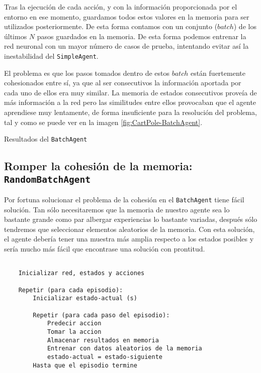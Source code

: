 Tras la ejecución de cada acción, y con la información proporcionada por el entorno en ese momento, guardamos todos estos valores en la memoria para ser utilizados posteriormente. De esta forma contamos con un conjunto ($batch$) de los últimos $N$ pasos guardados en la memoria. De esta forma podemos entrenar la red neuronal con un mayor número de casos de prueba, intentando evitar así la inestabilidad del \texttt{SimpleAgent}.

El problema es que los pasos tomados dentro de estos $batch$ están fuertemente cohesionados entre sí, ya que al ser consecutivos la información aportada por cada uno de ellos era muy similar. La memoria de estados consecutivos proveía de más información a la red pero las similitudes entre ellos provocaban que el agente aprendiese muy lentamente, de forma insuficiente para la resolución del problema, tal y como se puede ver en la imagen \ref{fig:CartPole-BatchAgent}.

%
       {Resultados del \texttt{BatchAgent}}


\subsection{Romper la cohesión de la memoria: \texttt{RandomBatchAgent}}

Por fortuna solucionar el problema de la cohesión en el \texttt{BatchAgent} tiene fácil solución. Tan sólo necesitaremos que la memoria de nuestro agente sea lo bastante grande como par albergar experiencias lo bastante variadas, después sólo tendremos que seleccionar elementos aleatorios de la memoria. Con esta solución, el agente debería tener una muestra más amplia respecto a los estados posibles y sería mucho más fácil que encontrase una solución con prontitud.

\begin{minipage}{0.9\linewidth}%
    \begin{lstlisting}[frame=tb, caption=Pseudocódigo RandomBatchAgent, inputencoding=latin1, label=code:cartpole_drl3]
    
    Inicializar red, estados y acciones
    
    Repetir (para cada episodio):
        Inicializar estado-actual (s)
        
        Repetir (para cada paso del episodio):
            Predecir accion
            Tomar la accion
            Almacenar resultados en memoria
            Entrenar con datos aleatorios de la memoria
            estado-actual = estado-siguiente
        Hasta que el episodio termine
    \end{lstlisting}%
\end{minipage}

